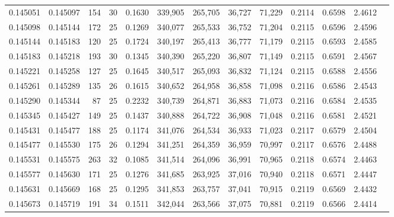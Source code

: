 \begin{tabular}{rrrrrrrrrrrrr}
0.145051 & 0.145097 & 154 &  30 &                                     0.1630 & 339,905 & 265,705 &  36,727 &  71,229 & 0.2114 & 0.6598 & 2.4612 \\
0.145098 & 0.145144 & 172 &  25 &                                     0.1269 & 340,077 & 265,533 &  36,752 &  71,204 & 0.2115 & 0.6596 & 2.4596 \\
0.145144 & 0.145183 & 120 &  25 &                                     0.1724 & 340,197 & 265,413 &  36,777 &  71,179 & 0.2115 & 0.6593 & 2.4585 \\
0.145183 & 0.145218 & 193 &  30 &                                     0.1345 & 340,390 & 265,220 &  36,807 &  71,149 & 0.2115 & 0.6591 & 2.4567 \\
0.145221 & 0.145258 & 127 &  25 &                                     0.1645 & 340,517 & 265,093 &  36,832 &  71,124 & 0.2115 & 0.6588 & 2.4556 \\
0.145261 & 0.145289 & 135 &  26 &                                     0.1615 & 340,652 & 264,958 &  36,858 &  71,098 & 0.2116 & 0.6586 & 2.4543 \\
0.145290 & 0.145344 &  87 &  25 &                                     0.2232 & 340,739 & 264,871 &  36,883 &  71,073 & 0.2116 & 0.6584 & 2.4535 \\
0.145345 & 0.145427 & 149 &  25 &                                     0.1437 & 340,888 & 264,722 &  36,908 &  71,048 & 0.2116 & 0.6581 & 2.4521 \\
0.145431 & 0.145477 & 188 &  25 &                                     0.1174 & 341,076 & 264,534 &  36,933 &  71,023 & 0.2117 & 0.6579 & 2.4504 \\
0.145477 & 0.145530 & 175 &  26 &                                     0.1294 & 341,251 & 264,359 &  36,959 &  70,997 & 0.2117 & 0.6576 & 2.4488 \\
0.145531 & 0.145575 & 263 &  32 &                                     0.1085 & 341,514 & 264,096 &  36,991 &  70,965 & 0.2118 & 0.6574 & 2.4463 \\
0.145577 & 0.145630 & 171 &  25 &                                     0.1276 & 341,685 & 263,925 &  37,016 &  70,940 & 0.2118 & 0.6571 & 2.4447 \\
0.145631 & 0.145669 & 168 &  25 &                                     0.1295 & 341,853 & 263,757 &  37,041 &  70,915 & 0.2119 & 0.6569 & 2.4432 \\
0.145673 & 0.145719 & 191 &  34 &                                     0.1511 & 342,044 & 263,566 &  37,075 &  70,881 & 0.2119 & 0.6566 & 2.4414 \\

\end{tabular}
